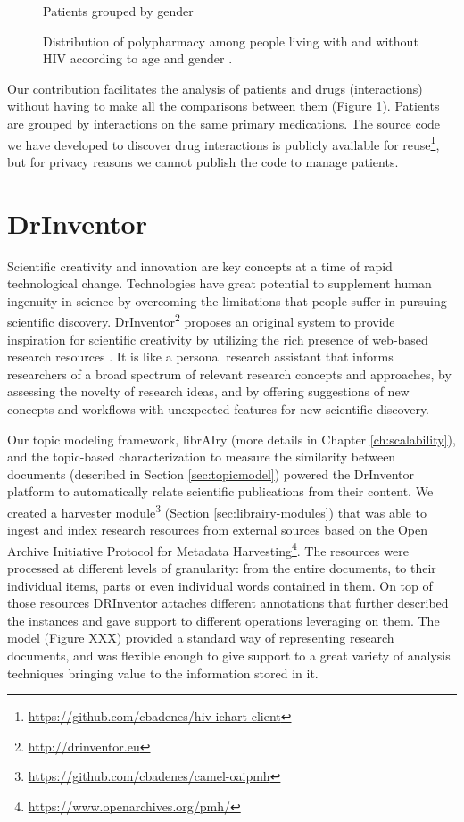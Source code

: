 \begin{figure}[ht]
\begin {minipage}[c]{0.49\textwidth}
     \caption{Patients grouped by gender}\label{subfig:poly-gender}
   \end{minipage}
   \caption{Distribution of polypharmacy among people living with and without HIV according to age and gender \citep{Badenes-Olmedo2019c}.}
   \label{fig:polypharmacy}
\end{figure}

Our contribution facilitates the analysis of patients and drugs (interactions) without having to make all the comparisons between them (Figure \ref{fig:polypharmacy}). Patients are grouped by interactions on the same primary medications. The source code we have developed to discover drug interactions is publicly available for reuse\footnote{\url{https://github.com/cbadenes/hiv-ichart-client}}, but for privacy reasons we cannot publish the code to manage patients. 

\section{DrInventor}
\label{sec:drinventor}

Scientific creativity and innovation are key concepts at a time of rapid technological change. Technologies have great potential to supplement human ingenuity in science by overcoming the limitations that people suffer in pursuing scientific discovery. DrInventor\footnote{\url{http://drinventor.eu}} proposes an original system to provide inspiration for scientific creativity by utilizing the rich presence of web-based research resources \citep{Dong2017DrIP}. It is like a personal research assistant that informs researchers of a broad spectrum of relevant research concepts and approaches, by assessing the novelty of research ideas, and by offering suggestions of new concepts and workflows with unexpected features for new scientific discovery.

Our topic modeling framework, librAIry (more details in Chapter \ref{ch:scalability}), and the topic-based characterization to measure the similarity between documents (described in Section \ref{sec:topicmodel}) powered the DrInventor platform to automatically relate scientific publications from their content. We created a harvester module\footnote{\url{https://github.com/cbadenes/camel-oaipmh}} (Section \ref{sec:librairy-modules})  that was able to ingest and index research resources from external sources based on the Open Archive Initiative Protocol for Metadata Harvesting\footnote{\url{https://www.openarchives.org/pmh/}}. The resources were processed at different levels of granularity: from the entire documents, to their individual items, parts or even individual words contained in them. On top of those resources DRInventor attaches different annotations that further described the instances and gave support to different operations leveraging on them. The model (Figure XXX) provided a standard way of representing research documents, and was flexible enough to give support to a great variety of analysis techniques bringing value to the information stored in it. 

